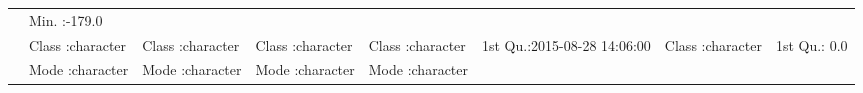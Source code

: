 \documentclass[]{article}
\theoremstyle{definition}
\theoremstyle{definition}
\theoremstyle{definition}
\theoremstyle{remark}
\begin{document}
\begin{longtable}[]{@{}llllllll@{}}
\begin{minipage}[t]{0.10\columnwidth}
\end{minipage} & \begin{minipage}[t]{0.09\columnwidth}\raggedright\strut
Min. :-179.0\strut
\end{minipage}\tabularnewline
\begin{minipage}[t]{0.02\columnwidth}\raggedright\strut
\strut
\end{minipage} & \begin{minipage}[t]{0.10\columnwidth}\raggedright\strut
Class :character\strut
\end{minipage} & \begin{minipage}[t]{0.10\columnwidth}\raggedright\strut
Class :character\strut
\end{minipage} & \begin{minipage}[t]{0.10\columnwidth}\raggedright\strut
Class :character\strut
\end{minipage} & \begin{minipage}[t]{0.10\columnwidth}\raggedright\strut
Class :character\strut
\end{minipage} & \begin{minipage}[t]{0.16\columnwidth}\raggedright\strut
1st Qu.:2015-08-28 14:06:00\strut
\end{minipage} & \begin{minipage}[t]{0.10\columnwidth}\raggedright\strut
Class :character\strut
\end{minipage} & \begin{minipage}[t]{0.09\columnwidth}\raggedright\strut
1st Qu.: 0.0\strut
\end{minipage}\tabularnewline
\begin{minipage}[t]{0.02\columnwidth}\raggedright\strut
\strut
\end{minipage} & \begin{minipage}[t]{0.10\columnwidth}\raggedright\strut
Mode :character\strut
\end{minipage} & \begin{minipage}[t]{0.10\columnwidth}\raggedright\strut
Mode :character\strut
\end{minipage} & \begin{minipage}[t]{0.10\columnwidth}\raggedright\strut
Mode :character\strut
\end{minipage} & \begin{minipage}[t]{0.10\columnwidth}\raggedright\strut
Mode :character\strut
\end{minipage} & \begin{minipage}[t]{0.16\columnwidth}\raggedright\strut

\end{minipage}
\end{longtable}
\end{document}
